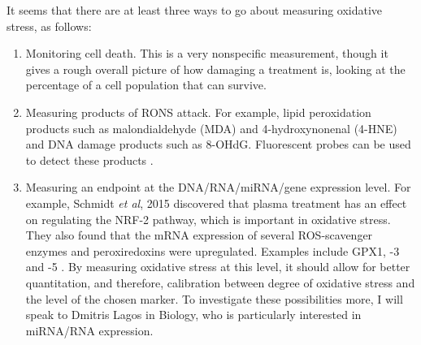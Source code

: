 \documentclass[11pt, oneside]{article}   	%
\begin{document}
It seems that there are at least three ways to go about measuring oxidative stress, as follows:
\begin{enumerate}
\item Monitoring cell death.
This is a very nonspecific measurement, though it gives a rough overall picture of how damaging a treatment is, looking at the percentage of a cell population that can survive.
\item Measuring products of RONS attack.
For example, lipid peroxidation products such as malondialdehyde (MDA) and 4-hydroxynonenal (4-HNE) \cite{Ayala2014lipid} and DNA damage products such as 8-OHdG. Fluorescent probes can be used to detect these products \cite{Ayala2014lipid, Joshi2011nonthermal, Joshi2010control}.
\item Measuring an endpoint at the DNA/RNA/miRNA/gene expression level.
For example, Schmidt \textit{et al}, 2015 discovered that plasma treatment has an effect on regulating the NRF-2 pathway, which is important in oxidative stress. They also found that the mRNA expression of several ROS-scavenger enzymes and peroxiredoxins were upregulated. Examples include GPX1, -3 and -5 \cite{Schmidt2015non}.
By measuring oxidative stress at this level, it should allow for better quantitation, and therefore, calibration between degree of oxidative stress and the level of the chosen marker.
To investigate these possibilities more, I will speak to Dmitris Lagos in Biology, who is particularly interested in miRNA/RNA expression.

\end{enumerate}
\end{document}
